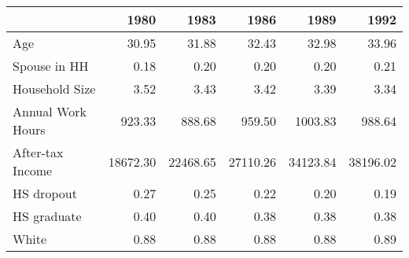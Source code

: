 \begin{tabular}{lrrrrr}
\toprule
{} &      1980 &      1983 &      1986 &      1989 &      1992 \\
\midrule
Age               &     30.95 &     31.88 &     32.43 &     32.98 &     33.96 \\
Spouse in HH      &      0.18 &      0.20 &      0.20 &      0.20 &      0.21 \\
Household Size    &      3.52 &      3.43 &      3.42 &      3.39 &      3.34 \\
Annual Work Hours &    923.33 &    888.68 &    959.50 &   1003.83 &    988.64 \\
After-tax Income  &  18672.30 &  22468.65 &  27110.26 &  34123.84 &  38196.02 \\
HS dropout        &      0.27 &      0.25 &      0.22 &      0.20 &      0.19 \\
HS graduate       &      0.40 &      0.40 &      0.38 &      0.38 &      0.38 \\
White             &      0.88 &      0.88 &      0.88 &      0.88 &      0.89 \\
\bottomrule
\end{tabular}
